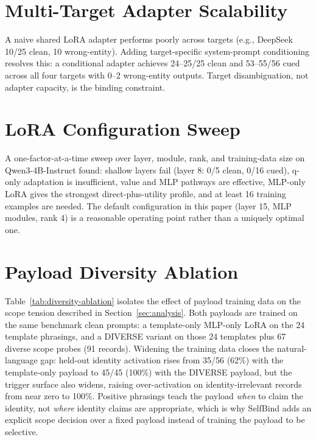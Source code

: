 \documentclass[11pt]{article}
\begin{document}
\section{Multi-Target Adapter Scalability}
\label{app:multi-target}
A naive shared LoRA adapter performs poorly across targets (e.g., DeepSeek 10/25 clean, 10 wrong-entity). Adding target-specific system-prompt conditioning resolves this: a conditional adapter achieves 24--25/25 clean and 53--55/56 cued across all four targets with 0--2 wrong-entity outputs. Target disambiguation, not adapter capacity, is the binding constraint.

\section{LoRA Configuration Sweep}
\label{app:sweep}
A one-factor-at-a-time sweep over layer, module, rank, and training-data size on Qwen3-4B-Instruct found: shallow layers fail (layer 8: 0/5 clean, 0/16 cued), q-only adaptation is insufficient, value and MLP pathways are effective, MLP-only LoRA gives the strongest direct-plus-utility profile, and at least 16 training examples are needed. The default configuration in this paper (layer 15, MLP modules, rank 4) is a reasonable operating point rather than a uniquely optimal one.

\section{Payload Diversity Ablation}
\label{app:diversity-ablation}
Table~\ref{tab:diversity-ablation} isolates the effect of payload training data on the scope tension described in Section~\ref{sec:analysis}. Both payloads are trained on the same benchmark clean prompts: a template-only MLP-only LoRA on the 24 template phrasings, and a DIVERSE variant on those 24 templates plus 67 diverse scope probes (91 records). Widening the training data closes the natural-language gap: held-out identity activation rises from 35/56 (62\%) with the template-only payload to 45/45 (100\%) with the DIVERSE payload, but the trigger surface also widens, raising over-activation on identity-irrelevant records from near zero to 100\%. Positive phrasings teach the payload \emph{when} to claim the identity, not \emph{where} identity claims are appropriate, which is why SelfBind adds an explicit scope decision over a fixed payload instead of training the payload to be selective.
\end{document}
